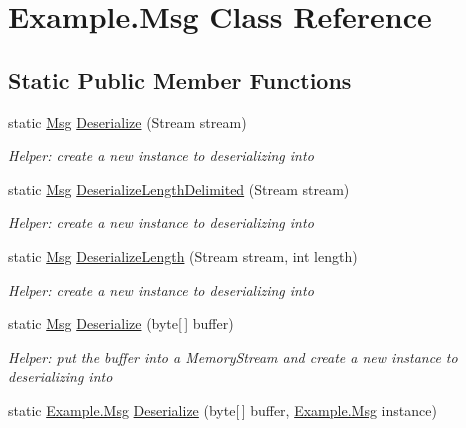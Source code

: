 \hypertarget{class_example_1_1_msg}{}\section{Example.\+Msg Class Reference}
\label{class_example_1_1_msg}
\subsection*{Static Public Member Functions}
\begin{DoxyCompactItemize}
\item 
static \hyperlink{class_example_1_1_msg}{Msg} \hyperlink{class_example_1_1_msg_a80dd17c33b49732e8d696c27d14955d5}{Deserialize} (Stream stream)
\begin{DoxyCompactList}\small\item\em Helper\+: create a new instance to deserializing into\end{DoxyCompactList}\item 
static \hyperlink{class_example_1_1_msg}{Msg} \hyperlink{class_example_1_1_msg_ad21dc5b0d3210a40a3f27db6dd62ac2b}{Deserialize\+Length\+Delimited} (Stream stream)
\begin{DoxyCompactList}\small\item\em Helper\+: create a new instance to deserializing into\end{DoxyCompactList}\item 
static \hyperlink{class_example_1_1_msg}{Msg} \hyperlink{class_example_1_1_msg_a20c91f6ab824db878c0289e98369081a}{Deserialize\+Length} (Stream stream, int length)
\begin{DoxyCompactList}\small\item\em Helper\+: create a new instance to deserializing into\end{DoxyCompactList}\item 
static \hyperlink{class_example_1_1_msg}{Msg} \hyperlink{class_example_1_1_msg_a8070c76dc5a3026a5805b77239769253}{Deserialize} (byte\mbox{[}$\,$\mbox{]} buffer)
\begin{DoxyCompactList}\small\item\em Helper\+: put the buffer into a Memory\+Stream and create a new instance to deserializing into\end{DoxyCompactList}\item 
static \hyperlink{class_example_1_1_msg}{Example.\+Msg} \hyperlink{class_example_1_1_msg_a04fa901ea1daced3b5ba715b692dbf82}{Deserialize} (byte\mbox{[}$\,$\mbox{]} buffer, \hyperlink{class_example_1_1_msg}{Example.\+Msg} instance)

\end{DoxyCompactItemize}
